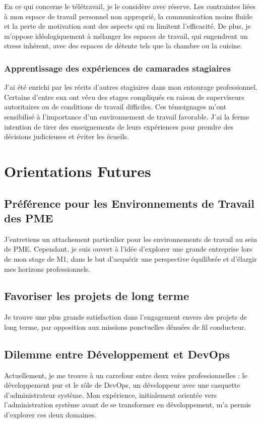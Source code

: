 En ce qui concerne le télétravail, je le considère avec réserve.
Les contraintes liées à mon espace de travail personnel non approprié, la communication moins fluide et la perte de motivation sont des aspects qui en limitent l'efficacité.
De plus, je m'oppose idéologiquement à mélanger les espaces de travail, qui engendrent un stress inhérent, avec des espaces de détente tels que la chambre ou la cuisine.

\subsubsection{Apprentissage des expériences de camarades stagiaires}
J'ai été enrichi par les récits d'autres stagiaires dans mon entourage professionnel.
Certains d'entre eux ont vécu des stages compliqués en raison de superviseurs autoritaires ou de conditions de travail difficiles.
Ces témoignages m'ont sensibilisé à l'importance d'un environnement de travail favorable.
J'ai la ferme intention de tirer des enseignements de leurs expériences pour prendre des décisions judicieuses et éviter les écueils.


\section{Orientations Futures}
\subsection{Préférence pour les Environnements de Travail des PME}
J'entretiens un attachement particulier pour les environnements de travail au sein de PME.
Cependant, je suis ouvert à l'idée d'explorer une grande entreprise lors de mon stage de M1, dans le but d'acquérir une perspective équilibrée et d'élargir mes horizons professionnels.

\subsection{Favoriser les projets de long terme}
Je trouve une plus grande satisfaction dans l'engagement envers des projets de long terme, par opposition aux missions ponctuelles dénuées de fil conducteur.

\subsection{Dilemme entre Développement et DevOps}
Actuellement, je me trouve à un carrefour entre deux voies professionnelles : le développement pur et le rôle de DevOps, un développeur avec une casquette d'administrateur système.
Mon expérience, initialement orientée vers l'administration système avant de se transformer en développement, m'a permis d'explorer ces deux domaines.

